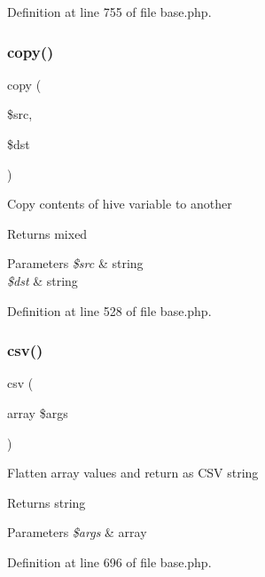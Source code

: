 Definition at line 755 of file base.\+php.

\hypertarget{class_base_a9051a0cda0ec6cae19cbd32e3945f31a}{}\label{class_base_a9051a0cda0ec6cae19cbd32e3945f31a} 
\subsubsection{\texorpdfstring{copy()}{copy()}}
{\footnotesize\ttfamily copy (\begin{DoxyParamCaption}\item[{}]{\$src,  }\item[{}]{\$dst }\end{DoxyParamCaption})}

Copy contents of hive variable to another \begin{DoxyReturn}{Returns}
mixed 
\end{DoxyReturn}

\begin{DoxyParams}{Parameters}
{\em \$src} & string \\
\hline
{\em \$dst} & string \\
\hline
\end{DoxyParams}


Definition at line 528 of file base.\+php.

\hypertarget{class_base_a2f39631e6920b33e0e88713de4566bdc}{}\label{class_base_a2f39631e6920b33e0e88713de4566bdc} 
\subsubsection{\texorpdfstring{csv()}{csv()}}
{\footnotesize\ttfamily csv (\begin{DoxyParamCaption}\item[{array}]{\$args }\end{DoxyParamCaption})}

Flatten array values and return as C\+SV string \begin{DoxyReturn}{Returns}
string 
\end{DoxyReturn}

\begin{DoxyParams}{Parameters}
{\em \$args} & array \\
\hline
\end{DoxyParams}


Definition at line 696 of file base.\+php.

\hypertarget{class_base_a4afbb486f4a5ff5a8170c832f5997986}{}\label{class_base_a4afbb486f4a5ff5a8170c832f5997986} 
